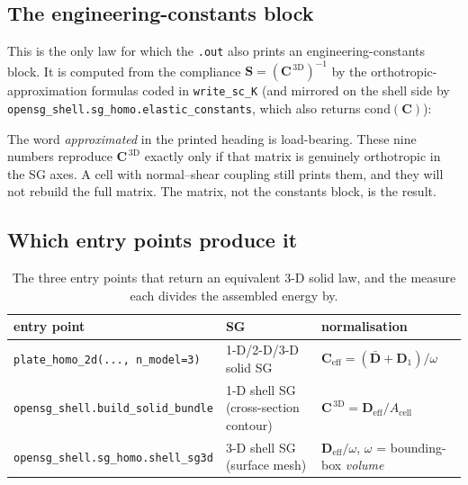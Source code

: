 \subsection{The engineering-constants block}

This is the only law for which the \texttt{.out} also prints an
engineering-constants block. It is computed from the compliance
$\mathbf S = (\mathbf C^{\,\mathrm{3D}})^{-1}$ by the orthotropic-approximation
formulas coded in \texttt{write\_sc\_K} (and mirrored on the shell side by
\texttt{opensg\_shell.sg\_homo.elastic\_constants}, which also returns
$\mathrm{cond}(\mathbf C)$):


The word \emph{approximated} in the printed heading is load-bearing. These nine
numbers reproduce $\mathbf C^{\,\mathrm{3D}}$ exactly only if that matrix is
genuinely orthotropic in the SG axes. A cell with normal--shear coupling still
prints them, and they will not rebuild the full matrix. The matrix, not the
constants block, is the result.

\subsection{Which entry points produce it}

\begin{table}[htbp]
\centering
\caption{The three entry points that return an equivalent 3-D solid law, and
the measure each divides the assembled energy by.}
\label{tab:solidroutes}
\footnotesize
\begin{tabular}{lll}
\toprule
entry point & SG & normalisation \\
\midrule
\texttt{plate\_homo\_2d(..., n\_model=3)} & 1-D/2-D/3-D solid SG & $\mathbf C_{\mathrm{eff}} = (\bar{\mathbf D} + \mathbf D_1)/\omega$ \\
\texttt{opensg\_shell.build\_solid\_bundle} & 1-D shell SG (cross-section contour) & $\mathbf C^{\,\mathrm{3D}} = \mathbf D_{\mathrm{eff}}/A_{\mathrm{cell}}$ \\
\texttt{opensg\_shell.sg\_homo.shell\_sg3d} & 3-D shell SG (surface mesh) & $\mathbf D_{\mathrm{eff}}/\omega$, $\omega$ = bounding-box \emph{volume} \\
\bottomrule
\end{tabular}
\end{table}

